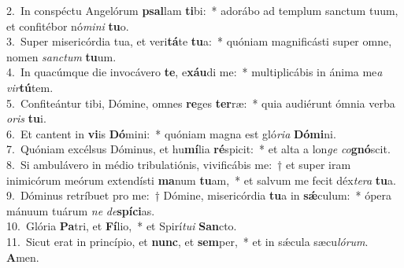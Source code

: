 {2.~}In conspéctu Angelórum \textbf{psal}lam \textbf{ti}bi:~* adorábo ad templum sanctum tuum, et confitébor nó\textit{mi}\textit{ni} \textbf{tu}o.\\
{3.~}Super misericórdia tua, et veri\textbf{tá}te \textbf{tu}a:~* quóniam magnificásti super omne, nomen \textit{san}\textit{ctum} \textbf{tu}um.\\
{4.~}In quacúmque die invocávero \textbf{te}, e\textbf{xáu}di me:~* multiplicábis in ánima me\textit{a} \textit{vir}\textbf{tú}tem.\\
{5.~}Confiteántur tibi, Dómine, omnes \textbf{re}ges \textbf{ter}ræ:~* quia audiérunt ómnia verba \textit{o}\textit{ris} \textbf{tu}i.\\
{6.~}Et cantent in \textbf{vi}is \textbf{Dó}mini:~* quóniam magna est gló\textit{ri}\textit{a} \textbf{Dó}\textbf{mi}ni.\\
{7.~}Quóniam excélsus Dóminus, et hu\textbf{mí}lia \textbf{ré}spicit:~* et alta a lon\textit{ge} \textit{co}\textbf{gnó}scit.\\
{8.~}Si ambulávero in médio tribulatiónis, vivificábis me:~† et super iram inimicórum meórum extendísti \textbf{ma}num \textbf{tu}am,~* et salvum me fecit déx\textit{te}\textit{ra} \textbf{tu}a.\\
{9.~}Dóminus retríbuet pro me:~† Dómine, misericórdia \textbf{tu}a in \textbf{sǽ}culum:~* ópera mánuum tuárum \textit{ne} \textit{de}\textbf{spí}\textbf{ci}as.\\
{10.~}Glória \textbf{Pa}tri, et \textbf{Fí}lio,~* et Spirí\textit{tu}\textit{i} \textbf{San}cto.\\
{11.~}Sicut erat in princípio, et \textbf{nunc}, et \textbf{sem}per,~* et in sǽcula sæcu\textit{ló}\textit{rum}. \textbf{A}men.\\
